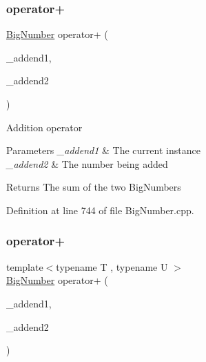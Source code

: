 \subsubsection{\texorpdfstring{operator+}{operator+}\hspace{0.1cm}{\footnotesize\ttfamily [1/2]}}
{\footnotesize\ttfamily \mbox{\hyperlink{class_big_nums_1_1_big_number}{Big\+Number}} operator+ (\begin{DoxyParamCaption}\item[{\mbox{\hyperlink{class_big_nums_1_1_big_number}{Big\+Number}}}]{\+\_\+addend1,  }\item[{const \mbox{\hyperlink{class_big_nums_1_1_big_number}{Big\+Number}} \&}]{\+\_\+addend2 }\end{DoxyParamCaption})\hspace{0.3cm}{\ttfamily [friend]}}

Addition operator 
\begin{DoxyParams}{Parameters}
{\em \+\_\+addend1} & The current instance \\
\hline
{\em \+\_\+addend2} & The number being added \\
\hline
\end{DoxyParams}
\begin{DoxyReturn}{Returns}
The sum of the two Big\+Numbers 
\end{DoxyReturn}


Definition at line 744 of file Big\+Number.\+cpp.

\mbox{\label{class_big_nums_1_1_big_number_ab90a430bf6202a4f133fc915101cd929}} 
\subsubsection{\texorpdfstring{operator+}{operator+}\hspace{0.1cm}{\footnotesize\ttfamily [2/2]}}
{\footnotesize\ttfamily template$<$typename T , typename U $>$ \\
\mbox{\hyperlink{class_big_nums_1_1_big_number}{Big\+Number}} operator+ (\begin{DoxyParamCaption}\item[{const T \&}]{\+\_\+addend1,  }\item[{const U \&}]{\+\_\+addend2 }\end{DoxyParamCaption})\hspace{0.3cm}{\ttfamily [friend]}}



